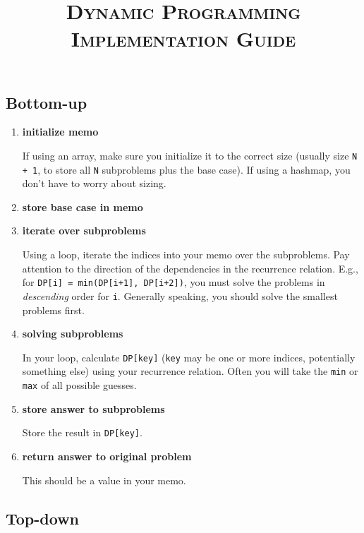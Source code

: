 \documentclass{article}
\title{\large{\textsc{\vspace{-1cm}Dynamic Programming Implementation Guide}}}
\date{}
\begin{document}
\maketitle

\subsection*{Bottom-up}

\begin{enumerate}
    \item \textbf{initialize memo}
    
If using an array, make sure you initialize it to the correct size (usually size \texttt{N + 1}, to store all \texttt{N} subproblems plus the base case). If using a hashmap, you don't have to worry about sizing.

    \item \textbf{store base case in memo}
    
    \item \textbf{iterate over subproblems}
    
Using a loop, iterate the indices into your memo over the subproblems. Pay attention to the direction of the dependencies in the recurrence relation. E.g., for \texttt{DP[i] = min(DP[i+1], DP[i+2])}, you must solve the problems in \textit{descending} order for \texttt{i}. Generally speaking, you should solve the smallest problems first.
    
    \item \textbf{solving subproblems}
    
    In your loop, calculate \texttt{DP[key]} (\texttt{key} may be one or more indices, potentially something else) using your recurrence relation. Often you will take the \texttt{min} or \texttt{max} of all possible guesses.
    
    \item \textbf{store answer to subproblems}
    
    Store the result in \texttt{DP[key]}.
    
    \item \textbf{return answer to original problem}
    
    This should be a value in your memo.
    
\end{enumerate}

\subsection*{Top-down}
\end{document}
